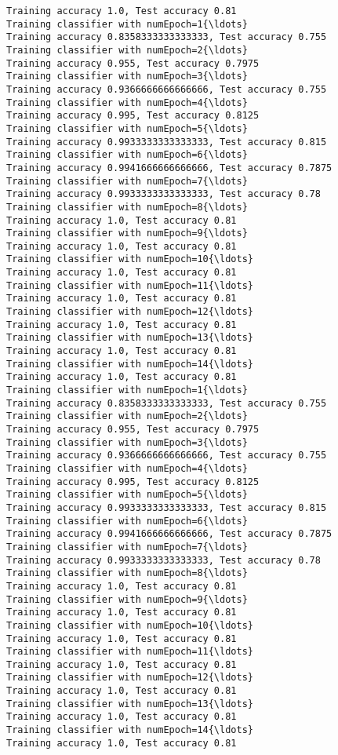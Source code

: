 \documentclass[11pt]{article}
\begin{document}
\begin{Verbatim}[commandchars=\\\{\}]
Training accuracy 1.0, Test accuracy 0.81
Training classifier with numEpoch=1{\ldots}
Training accuracy 0.8358333333333333, Test accuracy 0.755
Training classifier with numEpoch=2{\ldots}
Training accuracy 0.955, Test accuracy 0.7975
Training classifier with numEpoch=3{\ldots}
Training accuracy 0.9366666666666666, Test accuracy 0.755
Training classifier with numEpoch=4{\ldots}
Training accuracy 0.995, Test accuracy 0.8125
Training classifier with numEpoch=5{\ldots}
Training accuracy 0.9933333333333333, Test accuracy 0.815
Training classifier with numEpoch=6{\ldots}
Training accuracy 0.9941666666666666, Test accuracy 0.7875
Training classifier with numEpoch=7{\ldots}
Training accuracy 0.9933333333333333, Test accuracy 0.78
Training classifier with numEpoch=8{\ldots}
Training accuracy 1.0, Test accuracy 0.81
Training classifier with numEpoch=9{\ldots}
Training accuracy 1.0, Test accuracy 0.81
Training classifier with numEpoch=10{\ldots}
Training accuracy 1.0, Test accuracy 0.81
Training classifier with numEpoch=11{\ldots}
Training accuracy 1.0, Test accuracy 0.81
Training classifier with numEpoch=12{\ldots}
Training accuracy 1.0, Test accuracy 0.81
Training classifier with numEpoch=13{\ldots}
Training accuracy 1.0, Test accuracy 0.81
Training classifier with numEpoch=14{\ldots}
Training accuracy 1.0, Test accuracy 0.81
Training classifier with numEpoch=1{\ldots}
Training accuracy 0.8358333333333333, Test accuracy 0.755
Training classifier with numEpoch=2{\ldots}
Training accuracy 0.955, Test accuracy 0.7975
Training classifier with numEpoch=3{\ldots}
Training accuracy 0.9366666666666666, Test accuracy 0.755
Training classifier with numEpoch=4{\ldots}
Training accuracy 0.995, Test accuracy 0.8125
Training classifier with numEpoch=5{\ldots}
Training accuracy 0.9933333333333333, Test accuracy 0.815
Training classifier with numEpoch=6{\ldots}
Training accuracy 0.9941666666666666, Test accuracy 0.7875
Training classifier with numEpoch=7{\ldots}
Training accuracy 0.9933333333333333, Test accuracy 0.78
Training classifier with numEpoch=8{\ldots}
Training accuracy 1.0, Test accuracy 0.81
Training classifier with numEpoch=9{\ldots}
Training accuracy 1.0, Test accuracy 0.81
Training classifier with numEpoch=10{\ldots}
Training accuracy 1.0, Test accuracy 0.81
Training classifier with numEpoch=11{\ldots}
Training accuracy 1.0, Test accuracy 0.81
Training classifier with numEpoch=12{\ldots}
Training accuracy 1.0, Test accuracy 0.81
Training classifier with numEpoch=13{\ldots}
Training accuracy 1.0, Test accuracy 0.81
Training classifier with numEpoch=14{\ldots}
Training accuracy 1.0, Test accuracy 0.81

\end{Verbatim}
\end{document}
